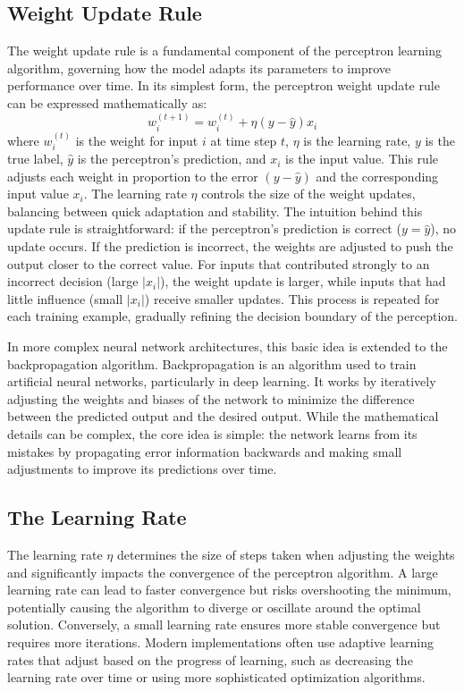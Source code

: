 \subsection{Weight Update Rule}
The weight update rule is a fundamental component of the perceptron learning algorithm, governing how the model adapts its parameters to improve performance over time. In its simplest form, the perceptron weight update rule can be expressed mathematically as:
\begin{equation}
w_i^{(t+1)}=w_i^{(t)}+\eta(y-\hat{y})x_i
\end{equation}
where $w_i^{(t)}$ is the weight for input $i$ at time step $t$, $\eta$ is the learning rate, $y$ is the true label, $\hat{y}$ is the perceptron's prediction, and $x_i$ is the input value. This rule adjusts each weight in proportion to the error $(y - \hat{y})$ and the corresponding input value $x_i$. The learning rate $\eta$ controls the size of the weight updates, balancing between quick adaptation and stability.
The intuition behind this update rule is straightforward: if the perceptron's prediction is correct ($y = \hat{y}$), no update occurs. If the prediction is incorrect, the weights are adjusted to push the output closer to the correct value. For inputs that contributed strongly to an incorrect decision (large $|x_i|$), the weight update is larger, while inputs that had little influence (small $|x_i|$) receive smaller updates. This process is repeated for each training example, gradually refining the decision boundary of the perception.

In more complex neural network architectures, this basic idea is extended to the backpropagation algorithm. Backpropagation is an algorithm used to train artificial neural networks, particularly in deep learning. It works by iteratively adjusting the weights and biases of the network to minimize the difference between the predicted output and the desired output. While the mathematical details can be complex, the core idea is simple: the network learns from its mistakes by propagating error information backwards and making small adjustments to improve its predictions over time.

\subsection{The Learning Rate}
The learning rate $\eta$ determines the size of steps taken when adjusting the weights and significantly impacts the convergence of the perceptron algorithm. A large learning rate can lead to faster convergence but risks overshooting the minimum, potentially causing the algorithm to diverge or oscillate around the optimal solution. Conversely, a small learning rate ensures more stable convergence but requires more iterations. Modern implementations often use adaptive learning rates that adjust based on the progress of learning, such as decreasing the learning rate over time or using more sophisticated optimization algorithms.

